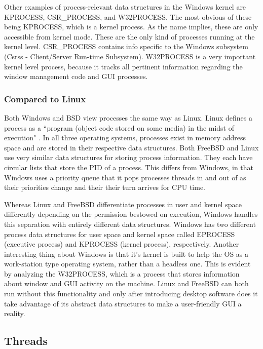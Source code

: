 \par Other examples of process-relevant data structures in the Windows kernel are KPROCESS, CSR\_PROCESS, and W32PROCESS.
The most obvious of these being KPROCESS, which is a kernel process.
As the name implies, these are only accessible from kernel mode.
These are the only kind of processes running at the kernel level.
CSR\_PROCESS contains info specific to the Windows subsystem (Csrss - Client/Server Run-time Subsystem).
W32PROCESS is a very important kernel level process, because it tracks all pertinent information regarding the window management code and GUI processes.

\subsubsection{Compared to Linux}
\label{sub:Process Linux}

\par Both Windows and BSD view processes the same way as Linux.
Linux defines a process as a ``program (object code stored on some media) in the midst of execution" \cite{linux:1}.
In all three operating systems, processes exist in memory address space and are stored in their respective data structures.
Both FreeBSD and Linux use very similar data structures for storing process information.
They each have circular lists that store the PID of a process.
This differs from Windows, in that Windows uses a priority queue that it pops processes threads in and out of as their priorities change and their their turn arrives for CPU time.

\par Whereas Linux and FreeBSD differentiate processes in user and kernel space differently depending on the permission bestowed on execution, Windows handles this separation with entirely different data structures.
Windows has two different process data structures for user space and kernel space called EPROCESS (executive process) and KPROCESS (kernel process), respectively.
Another interesting thing about Windows is that it's kernel is built to help the OS as a work-station type operating system, rather than a headless one.
This is evident by analyzing the W32PROCESS, which is a process that stores information about window and GUI activity on the machine.
Linux and FreeBSD can both run without this functionality and only after introducing desktop software does it take advantage of its abstract data structures to make a user-friendly GUI a reality.

\subsection{Threads}
\label{sec:Threads}

